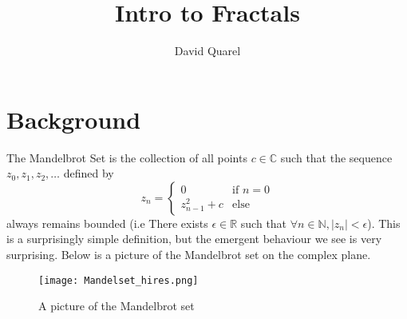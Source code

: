 \documentclass[a4paper,12pt]{article}
\begin{document}
\title{Intro to Fractals}
\author{David Quarel}
\date{}
\maketitle


\section{Background}
The Mandelbrot Set is the collection of all points $c \in \mathbb{C}$ such that the sequence $z_0,z_1,z_2,\ldots$ defined by
\begin{equation*}
	z_{n} = 
	\begin{cases}
		0    		& \text{if } n=0\\
		z_{n-1}^2 + c 	& \text{else} 			
	\end{cases}
\end{equation*}
always remains bounded (i.e There exists $\epsilon \in \mathbb{R}$ such that $\forall n \in \mathbb{N}, |z_n|<\epsilon$). This is a surprisingly simple definition, but the emergent behaviour we see
is very surprising. Below is a picture of the Mandelbrot set on the complex plane.

\begin{figure}[!ht]
	\centering
    \texttt{[image: Mandelset\_hires.png]}
    \caption{A picture of the Mandelbrot set\cite{Wiki}}
    \label{fig:1}
\end{figure}
\end{document}
